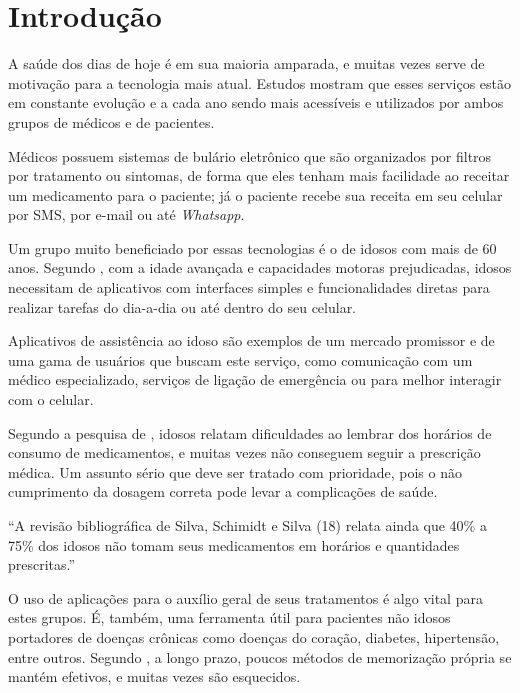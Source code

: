 \documentclass[
	article,			%
	12pt,				%
	oneside,			%
	a4paper,			%
    BIBLATEX,           %
	english,			%
	brazil,				%
	sumario=tradicional
	]{abntex2}
\begin{document}
\section{Introdução}

A saúde dos dias de hoje é em sua maioria amparada, e muitas vezes serve de motivação para a tecnologia mais atual. Estudos mostram que esses serviços estão em constante evolução e a cada ano sendo mais acessíveis e utilizados por ambos grupos de médicos e de pacientes.

Médicos possuem sistemas de bulário eletrônico que são organizados por filtros por tratamento ou sintomas, de forma que eles tenham mais facilidade ao receitar um medicamento para o paciente; já o paciente recebe sua receita em seu celular por SMS, por e-mail ou até \textit{Whatsapp}.

Um grupo muito beneficiado por essas tecnologias é o de idosos com mais de 60 anos. Segundo , com a idade avançada e capacidades motoras prejudicadas, idosos necessitam de aplicativos com interfaces simples e funcionalidades diretas para realizar tarefas do dia-a-dia ou até dentro do seu celular.

Aplicativos de assistência ao idoso são exemplos de um mercado promissor e de uma gama de usuários que buscam este serviço, como comunicação com um médico especializado,  serviços de ligação de emergência ou para melhor interagir com o celular.

Segundo a pesquisa de , idosos relatam dificuldades ao lembrar dos horários de consumo de medicamentos, e muitas vezes não conseguem seguir a prescrição médica. Um assunto sério que deve ser tratado com prioridade, pois o não cumprimento da dosagem correta pode levar a complicações de saúde.

\begin{citacao}
“A revisão bibliográfica de Silva, Schimidt e Silva (18) relata ainda que 40\% a 75\% dos idosos não tomam seus medicamentos em horários e quantidades prescritas.” \cite{clarisse2016}
\end{citacao}

O uso de aplicações para o auxílio geral de seus tratamentos é algo vital para estes grupos. É, também, uma ferramenta útil para pacientes não idosos portadores de doenças crônicas como doenças do coração, diabetes, hipertensão, entre outros. Segundo , a longo prazo, poucos métodos de memorização própria se mantém efetivos, e muitas vezes são esquecidos.
\end{document}
